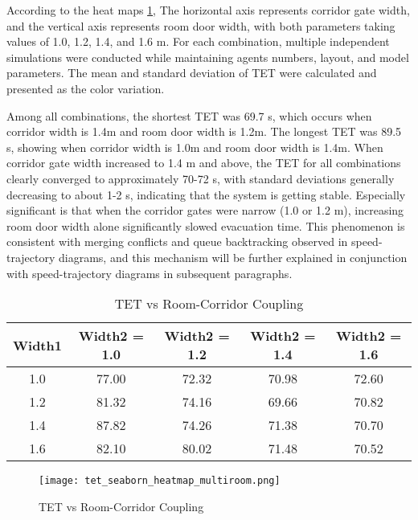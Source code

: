 According to the heat maps \ref{fig:tet_vs_room_corridor_coupling}, The horizontal axis represents corridor gate width, and the vertical axis represents room door width, with both parameters taking values of 1.0, 1.2, 1.4, and 1.6 m. For each combination, multiple independent simulations were conducted while maintaining agents numbers, layout, and model parameters. The mean and standard deviation of TET were calculated and presented as the color variation.

Among all combinations, the shortest TET was 69.7 s, which occurs when corridor width is 1.4m and room door width is 1.2m. The longest TET was 89.5 s, showing when corridor width is 1.0m and room door width is 1.4m. When corridor gate width increased to 1.4 m and above, the TET for all combinations clearly converged to approximately 70-72 s, with standard deviations generally decreasing to about 1-2 s, indicating that the system is getting stable. Especially significant is that when the corridor gates were narrow (1.0 or 1.2 m), increasing room door width alone significantly slowed evacuation time. This phenomenon is consistent with merging conflicts and queue backtracking observed in speed-trajectory diagrams, and this mechanism will be further explained in conjunction with speed-trajectory diagrams in subsequent paragraphs.

\begin{table}[ht]
    \caption{TET vs Room-Corridor Coupling}
    \centering 
    \begin{tabular}{c|c|c|c|c} 
        \hline
        Width1 & Width2 = 1.0 & Width2 = 1.2 & Width2 = 1.4 & Width2 = 1.6 \\ 
        \hline
        1.0 & 77.00 & 72.32 & 70.98 & 72.60 \\ 
        \hline
        1.2 & 81.32 & 74.16 & 69.66 & 70.82 \\
        \hline
        1.4 & 87.82 & 74.26 & 71.38 & 70.70 \\
        \hline
        1.6 & 82.10 & 80.02 & 71.48 & 70.52 \\
        \hline
    \end{tabular}
    \label{tab:tet_mean_values}
\end{table}

\begin{figure}[h]
    \centering
    \texttt{[image: tet\_seaborn\_heatmap\_multiroom.png]}
    \caption{TET vs Room-Corridor Coupling}
    \label{fig:tet_vs_room_corridor_coupling}
\end{figure}

